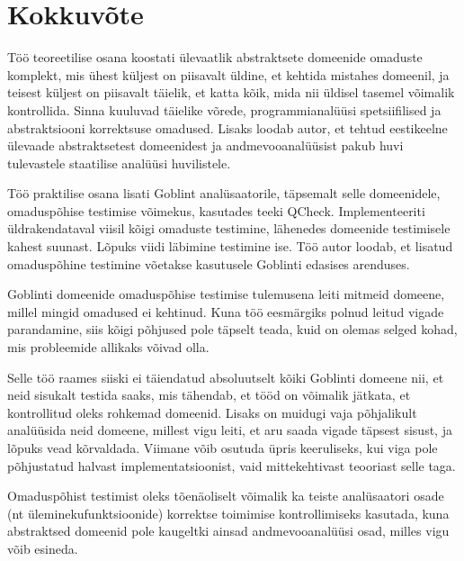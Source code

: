 \documentclass[../thesis.tex]{subfiles}
\begin{document}
\section{Kokkuvõte}

Töö teoreetilise osana koostati ülevaatlik abstraktsete domeenide omaduste komplekt, mis ühest küljest on piisavalt üldine, et kehtida mistahes domeenil, ja teisest küljest on piisavalt täielik, et katta kõik, mida nii üldisel tasemel võimalik kontrollida. Sinna kuuluvad täielike võrede, programmianalüüsi spetsiifilised ja abstraktsiooni korrektsuse omadused. Lisaks loodab autor, et tehtud eestikeelne ülevaade abstraktsetest domeenidest ja andmevooanalüüsist pakub huvi tulevastele staatilise analüüsi huvilistele.

Töö praktilise osana lisati Goblint analüsaatorile, täpsemalt selle domeenidele, omaduspõhise testimise võimekus, kasutades teeki QCheck. Implementeeriti üldrakendataval viisil kõigi omaduste testimine, lähenedes domeenide testimisele kahest suunast. Lõpuks viidi läbimine testimine ise. Töö autor loodab, et lisatud omaduspõhine testimine võetakse kasutusele Goblinti edasises arenduses.

Goblinti domeenide omaduspõhise testimise tulemusena leiti mitmeid domeene, millel mingid omadused ei kehtinud. Kuna töö eesmärgiks polnud leitud vigade parandamine, siis kõigi põhjused pole täpselt teada, kuid on olemas selged kohad, mis probleemide allikaks võivad olla.

Selle töö raames siiski ei täiendatud absoluutselt kõiki Goblinti domeene nii, et neid sisukalt testida saaks, mis tähendab, et tööd on võimalik jätkata, et kontrollitud oleks rohkemad domeenid. Lisaks on muidugi vaja põhjalikult analüüsida neid domeene, millest vigu leiti, et aru saada vigade täpsest sisust, ja lõpuks vead kõrvaldada. Viimane võib osutuda üpris keeruliseks, kui viga pole põhjustatud halvast implementatsioonist, vaid mittekehtivast teooriast selle taga.

Omaduspõhist testimist oleks tõenäoliselt võimalik ka teiste analüsaatori osade (nt üleminekufunktsioonide) korrektse toimimise kontrollimiseks kasutada, kuna abstraktsed domeenid pole kaugeltki ainsad andmevooanalüüsi osad, milles vigu võib esineda.

\end{document}
